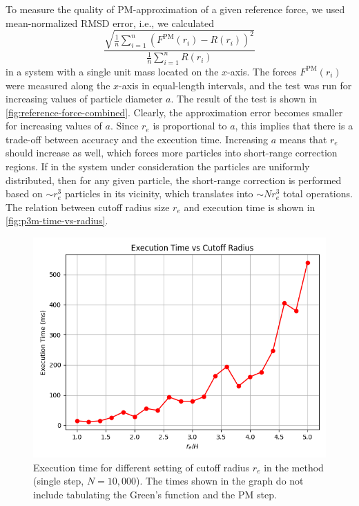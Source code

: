 To measure the quality of PM-approximation of a given reference force, we used mean-normalized RMSD error, i.e., we calculated
\begin{equation*}
    \frac{\sqrt{\frac{1}{n} \sum_{i=1}^{n} (F^\text{PM}(r_i) - R(r_i))^2}}{\frac{1}{n} \sum_{i=1}^{n} R(r_i)}
\end{equation*}
in a system with a single unit mass located on the $x$-axis.
The forces $F^\text{PM}(r_i)$ were measured along the $x$-axis in equal-length intervals, and the test was run for increasing values of particle diameter $a$.
The result of the test is shown in \autoref{fig:reference-force-combined}.
Clearly, the approximation error becomes smaller for increasing values of $a$.
Since $r_e$ is proportional to $a$, this implies that there is a trade-off between accuracy and the execution time.
Increasing $a$ means that $r_e$ should increase as well, which forces more particles into short-range correction regions.
If in the system under consideration the particles are uniformly distributed, then for any given particle, the short-range correction is performed based on $\sim r_e^3$ particles in its vicinity, which translates into $\sim N r_e^3$ total operations.
The relation between cutoff radius size $r_e$ and execution time is shown in \autoref{fig:p3m-time-vs-radius}.
\begin{figure}[htp]
    \centering
    \includegraphics[scale=0.5]{chapters/p3m-method/img/time-vs-radius.png}
    \caption{Execution time for different setting of cutoff radius $r_e$ in the \PThreeM{} method (single step, $N=10{,}000$).
    The times shown in the graph do not include tabulating the Green's function and the PM step.}
    \label{fig:p3m-time-vs-radius}
\end{figure}
